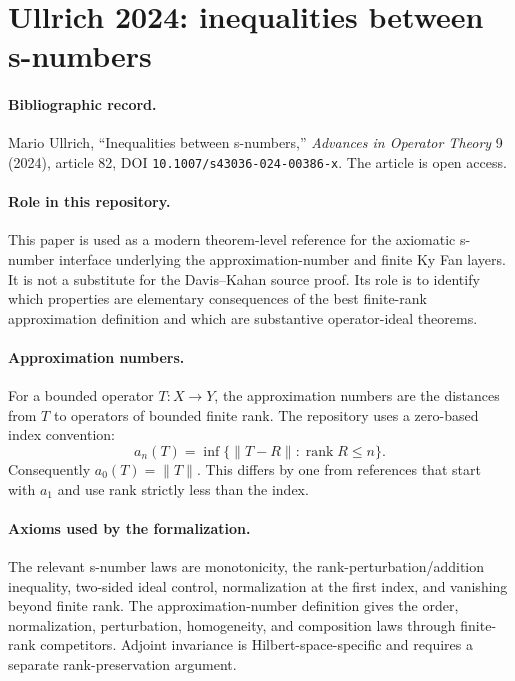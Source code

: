 \section{Ullrich 2024: inequalities between s-numbers}
\label{sec:ullrich-2024-s-numbers}

\paragraph{Bibliographic record.}
Mario Ullrich, ``Inequalities between s-numbers,''
\emph{Advances in Operator Theory} 9 (2024), article 82,
DOI \texttt{10.1007/s43036-024-00386-x}.
The article is open access.

\paragraph{Role in this repository.}
This paper is used as a modern theorem-level reference for the axiomatic
s-number interface underlying the approximation-number and finite Ky Fan
layers.  It is not a substitute for the Davis--Kahan source proof.  Its role is
to identify which properties are elementary consequences of the best
finite-rank approximation definition and which are substantive operator-ideal
theorems.

\paragraph{Approximation numbers.}
For a bounded operator $T:X\to Y$, the approximation numbers are the distances
from $T$ to operators of bounded finite rank.  The repository uses a zero-based
index convention:
\[
  a_n(T)=\inf\{\lVert T-R\rVert:\operatorname{rank}R\le n\}.
\]
Consequently $a_0(T)=\lVert T\rVert$.  This differs by one from references that
start with $a_1$ and use rank strictly less than the index.

\paragraph{Axioms used by the formalization.}
The relevant s-number laws are monotonicity, the rank-perturbation/addition
inequality, two-sided ideal control, normalization at the first index, and
vanishing beyond finite rank.  The approximation-number definition gives the
order, normalization, perturbation, homogeneity, and composition laws through
finite-rank competitors.  Adjoint invariance is Hilbert-space-specific and
requires a separate rank-preservation argument.

